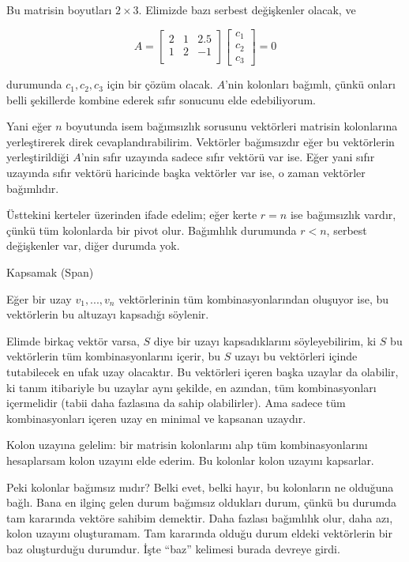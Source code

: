 \documentclass[12pt,fleqn]{article}\usepackage{../../common}
\begin{document}
Bu matrisin boyutları $2 \times 3$. Elimizde bazı serbest değişkenler
olacak, ve 

$$ 
A = 
\left[\begin{array}{rrr}
2 & 1 & 2.5 \\
1 & 2 & -1 \\
\end{array}\right]
\left[\begin{array}{r}
c_1 \\ c_2 \\ c_3
\end{array}\right] = 0
$$

durumunda $c_1,c_2,c_3$ için bir çözüm olacak. $A$'nin kolonları bağımlı,
çünkü onları belli şekillerde kombine ederek sıfır sonucunu elde
edebiliyorum. 

Yani eğer $n$ boyutunda isem bağımsızlık sorusunu vektörleri matrisin
kolonlarına yerleştirerek direk cevaplandırabilirim. Vektörler bağımsızdır
eğer bu vektörlerin yerleştirildiği $A$'nin sıfır uzayında sadece sıfır
vektörü var ise. Eğer yani sıfır uzayında sıfır vektörü haricinde başka
vektörler var ise, o zaman vektörler bağımlıdır. 

Üsttekini kerteler üzerinden ifade edelim; eğer kerte $r = n$ ise
bağımsızlık vardır, çünkü tüm kolonlarda bir pivot olur. Bağımlılık
durumunda $r < n$, serbest değişkenler var, diğer durumda yok. 

Kapsamak (Span) 

Eğer bir uzay $v_1,...,v_n$ vektörlerinin tüm kombinasyonlarından oluşuyor
ise,  bu vektörlerin bu altuzayı kapsadığı söylenir.

Elimde birkaç vektör varsa, $S$ diye bir uzayı kapsadıklarını
söyleyebilirim, ki $S$ bu vektörlerin tüm kombinasyonlarını içerir, bu $S$
uzayı bu vektörleri içinde tutabilecek en ufak uzay olacaktır. Bu
vektörleri içeren başka uzaylar da olabilir, ki tanım itibariyle bu uzaylar
aynı şekilde, en azından, tüm kombinasyonları içermelidir (tabii daha
fazlasına da sahip olabilirler). Ama sadece tüm kombinasyonları içeren uzay
en minimal ve kapsanan uzaydır. 

Kolon uzayına gelelim: bir matrisin kolonlarını alıp tüm kombinasyonlarını
hesaplarsam kolon uzayını elde ederim. Bu kolonlar kolon uzayını
kapsarlar. 

Peki kolonlar bağımsız mıdır? Belki evet, belki hayır, bu kolonların ne
olduğuna bağlı. Bana en ilginç gelen durum bağımsız oldukları durum, çünkü
bu durumda tam kararında vektöre sahibim demektir. Daha fazlası bağımlılık
olur, daha azı, kolon uzayını oluşturamam. Tam kararında olduğu durum
eldeki vektörlerin bir baz oluşturduğu durumdur. İşte ``baz'' kelimesi
burada devreye girdi. 
\end{document}
